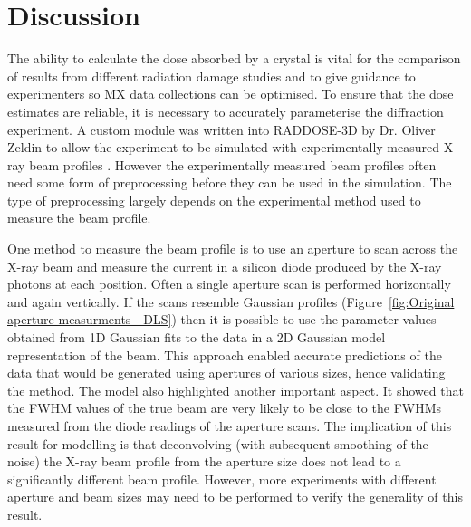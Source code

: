 \section{Discussion}
\label{sec:Discussion - Beam Chapter}
The ability to calculate the dose absorbed by a crystal is vital for the comparison of results from different radiation damage studies and to give guidance to experimenters so MX data collections can be optimised.
To ensure that the dose estimates are reliable, it is necessary to accurately parameterise the diffraction experiment.
A custom module was written into RADDOSE-3D by Dr. Oliver Zeldin to allow the experiment to be simulated with experimentally measured X-ray beam profiles \cite{zeldin2013dwd}.
However the experimentally measured beam profiles often need some form of preprocessing before they can be used in the simulation.
The type of preprocessing largely depends on the experimental method used to measure the beam profile.

One method to measure the beam profile is to use an aperture to scan across the X-ray beam and measure the current in a silicon diode produced by the X-ray photons at each position.
Often a single aperture scan is performed horizontally and again vertically.
If the scans resemble Gaussian profiles (Figure~\ref{fig:Original aperture measurments - DLS}) then it is possible to use the parameter values obtained from 1D Gaussian fits to the data in a 2D Gaussian model representation of the beam.
This approach enabled accurate predictions of the data that would be generated using apertures of various sizes, hence validating the method.
The model also highlighted another important aspect.
It showed that the FWHM values of the true beam are very likely to be close to the FWHMs measured from the diode readings of the aperture scans.
The implication of this result for modelling is that deconvolving (with subsequent smoothing of the noise) the X-ray beam profile from the aperture size does not lead to a significantly different beam profile.
However, more experiments with different aperture and beam sizes may need to be performed to verify the generality of this result.

